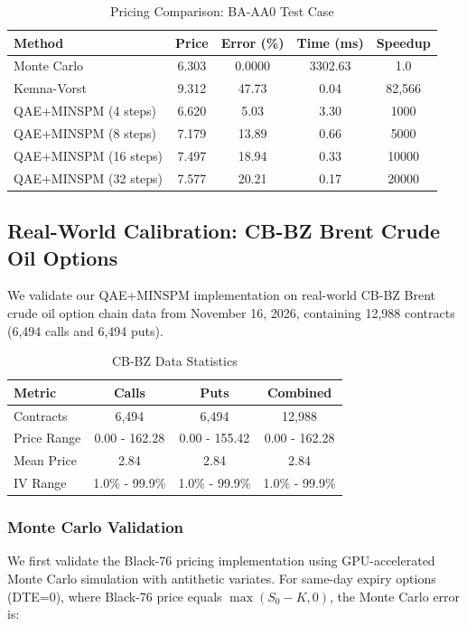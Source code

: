 \documentclass[12pt]{article}
\begin{document}
\begin{table}[H]
\centering
\begin{tabular}{lcccc}
\toprule
Method & Price & Error (\%) & Time (ms) & Speedup \\
\midrule
Monte Carlo & 6.303 & 0.0000 & 3302.63 & 1.0 \\
Kemna-Vorst & 9.312 & 47.73 & 0.04 & 82,566 \\
QAE+MINSPM (4 steps) & 6.620 & 5.03 & 3.30 & 1000 \\
QAE+MINSPM (8 steps) & 7.179 & 13.89 & 0.66 & 5000 \\
QAE+MINSPM (16 steps) & 7.497 & 18.94 & 0.33 & 10000 \\
QAE+MINSPM (32 steps) & 7.577 & 20.21 & 0.17 & 20000 \\
\bottomrule
\end{tabular}
\caption{Pricing Comparison: BA-AA0 Test Case}
\end{table}

\subsection{Real-World Calibration: CB-BZ Brent Crude Oil Options}

We validate our QAE+MINSPM implementation on real-world CB-BZ Brent crude oil option chain data from November 16, 2026, containing 12,988 contracts (6,494 calls and 6,494 puts).

\begin{table}[H]
\centering
\begin{tabular}{lccc}
\toprule
Metric & Calls & Puts & Combined \\
\midrule
Contracts & 6,494 & 6,494 & 12,988 \\
Price Range & 0.00 - 162.28 & 0.00 - 155.42 & 0.00 - 162.28 \\
Mean Price & 2.84 & 2.84 & 2.84 \\
IV Range & 1.0\% - 99.9\% & 1.0\% - 99.9\% & 1.0\% - 99.9\% \\
\bottomrule
\end{tabular}
\caption{CB-BZ Data Statistics}
\end{table}

\subsubsection{Monte Carlo Validation}

We first validate the Black-76 pricing implementation using GPU-accelerated Monte Carlo simulation with antithetic variates. For same-day expiry options (DTE=0), where Black-76 price equals $\max(S_0 - K, 0)$, the Monte Carlo error is:
\end{document}
